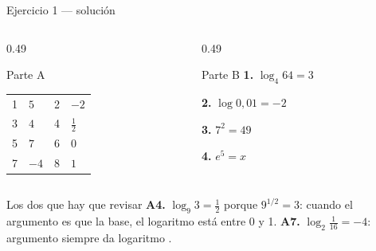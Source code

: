 \documentclass[aspectratio=169,10pt]{beamer}
\begin{document}
\begin{frame}{Ejercicio 1 — solución}
  \scriptsize
  \begin{columns}[T,onlytextwidth]
    \begin{column}{0.49\textwidth}
      \begin{block}{Parte A}
        \tiny
        \begin{center}
        \begin{tabular}{@{}llll@{}}
          1 & $5$ & 2 & $-2$ \\
          3 & $4$ & 4 & $\tfrac{1}{2}$ \\
          5 & $7$ & 6 & $0$ \\
          7 & $-4$ & 8 & $1$ \\
        \end{tabular}
        \end{center}
      \end{block}
    \end{column}
    \begin{column}{0.49\textwidth}
      \begin{block}{Parte B}
        \tiny
        \textbf{1.} $\log_{4}64 = 3$

        \textbf{2.} $\log 0{,}01 = -2$

        \textbf{3.} $7^{2} = 49$

        \textbf{4.} $e^{5} = x$
      \end{block}
    \end{column}
  \end{columns}

  \vspace{0.1cm}
  \begin{alertblock}{Los dos que hay que revisar}
    \tiny
    \textbf{A4.} $\log_{9}3 = \tfrac{1}{2}$ porque $9^{1/2}=3$: cuando el
    argumento es  que la base, el logaritmo está entre 0 y 1. \quad
    \textbf{A7.} $\log_{2}\tfrac{1}{16} = -4$: argumento 
    siempre da logaritmo .
  \end{alertblock}
\end{frame}
\end{document}
